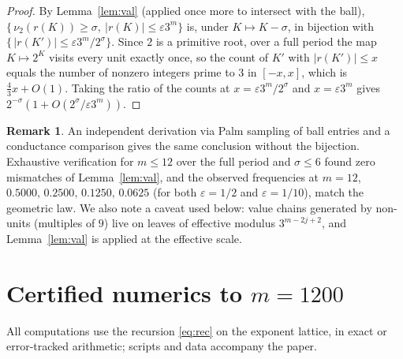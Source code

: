 \documentclass[11pt]{article}
\theoremstyle{definition}
\newtheorem{remark}[theorem]{Remark}
\begin{document}
\begin{proof}
By Lemma~\ref{lem:val} (applied once more to intersect with the ball),
$\{\,\nu_2(r(K))\ge\sigma,\ |r(K)|\le\varepsilon 3^m\}$ is, under
$K\mapsto K-\sigma$, in bijection with
$\{\,|r(K')|\le\varepsilon 3^m/2^{\sigma}\}$. Since $2$ is a primitive
root, over a full period the map $K\mapsto 2^K$ visits every unit
exactly once, so the count of $K'$ with $|r(K')|\le x$ equals the number
of nonzero integers prime to $3$ in $[-x,x]$, which is
$\tfrac{4}{3}x+O(1)$. Taking the ratio of the counts
at $x=\varepsilon 3^m/2^{\sigma}$ and $x=\varepsilon 3^m$ gives
$2^{-\sigma}(1+O(2^{\sigma}/\varepsilon 3^m))$.
\end{proof}

\begin{remark}
An independent derivation via Palm sampling of ball entries and a
conductance comparison gives the same conclusion without the bijection.
Exhaustive verification for $m\le 12$ over the full period and
$\sigma\le 6$ found zero mismatches of Lemma~\ref{lem:val}, and the
observed frequencies at $m=12$, $0.5000,\,0.2500,\,0.1250,\,0.0625$ (for
both $\varepsilon=1/2$ and $\varepsilon=1/10$), match the geometric law. We also note a caveat used below: value chains generated
by non-units (multiples of $9$) live on leaves of effective modulus
$3^{m-2j+2}$, and Lemma~\ref{lem:val} is applied at the effective scale.
\end{remark}

\section{Certified numerics to $m=1200$}\label{sec:numerics}

All computations use the recursion \eqref{eq:rec} on the exponent
lattice, in exact or error-tracked arithmetic; scripts and data
accompany the paper.
\end{document}
